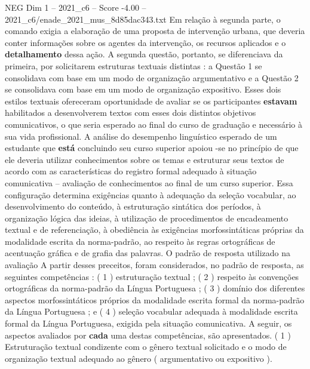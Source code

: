 \begin{textsample}{NEG Dim 1 – 2021\_c6 – Score -4.00 – 2021\_c6/enade\_2021\_mus\_8d85dac343.txt}
Em relação à segunda parte, o comando exigia a elaboração de uma proposta de intervenção urbana, que deveria conter informações sobre os agentes da intervenção, os recursos aplicados e o \textbf{detalhamento} dessa ação.
A segunda questão, portanto, se diferenciava da primeira, por solicitarem estruturas textuais distintas : a Questão 1 se consolidava com base em um modo de organização argumentativo e a Questão 2 se consolidava com base em um modo de organização expositivo.
Esses dois estilos textuais ofereceram oportunidade de avaliar se os participantes \textbf{estavam} habilitados a desenvolverem textos com esses dois distintos objetivos comunicativos, o que seria esperado ao final do curso de graduação e necessário à sua vida profissional.
A análise do desempenho linguístico esperado de um estudante que \textbf{está} concluindo seu curso superior apoiou -se no princípio de que ele deveria utilizar conhecimentos sobre os temas e estruturar seus textos de acordo com as características do registro formal adequado à situação comunicativa – avaliação de conhecimentos ao final de um curso superior.
Essa configuração determina exigências quanto à adequação da seleção vocabular, ao desenvolvimento do conteúdo, à estruturação sintática dos períodos, à organização lógica das ideias, à utilização de procedimentos de encadeamento textual e de referenciação, à obediência às exigências morfossintáticas próprias da modalidade escrita da norma-padrão, ao respeito às regras ortográficas de acentuação gráfica e de grafia das palavras.
O padrão de resposta utilizado na avaliação A partir desses preceitos, foram considerados, no padrão de resposta, as seguintes competências : ( 1 ) estruturação textual ; ( 2 ) respeito às convenções ortográficas da norma-padrão da Língua Portuguesa ; ( 3 ) domínio dos diferentes aspectos morfossintáticos próprios da modalidade escrita formal da norma-padrão da Língua Portuguesa ; e ( 4 ) seleção vocabular adequada à modalidade escrita formal da Língua Portuguesa, exigida pela situação comunicativa.
A seguir, os aspectos avaliados por \textbf{cada} uma destas competências, são apresentados. ( 1 ) Estruturação textual condizente com o gênero textual solicitado e o modo de organização textual adequado ao gênero ( argumentativo ou expositivo ).

\end{textsample}
